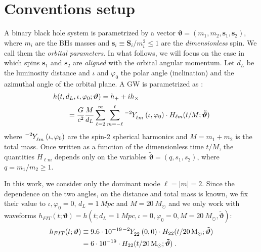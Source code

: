 \section{Conventions setup}
\label{sec:setup}
A binary black hole system is parametrized by a vector $ \boldsymbol{\vartheta} = (m_1,m_2, \mathbf{s}_1,\mathbf{s}_2) $, where $m_i$ are the 
BHs masses and $\mathbf{s}_i \equiv \mathbf{S}_i/m_i^2 \leq 1$ are the 
\textit{dimensionless} spin. We call them the \textit{orbital parameters}.
In what follows, we will focus on the case in which spins $\mathbf{s}_1$ and $\mathbf{s}_2$ are \textit{aligned} with the orbital angular momentum. 
Let $d_L$ be the luminosity distance and $\iota$ and $\varphi_0$ the polar angle (inclination) and the azimuthal angle of the orbital plane.
A GW is parametrized as \cite[eq. II.6]{ajith2011data}:
\begin{align} \label{eq:h_parametrization}
	&h(t, d_L,\iota,\varphi_0; \boldsymbol{\vartheta}) = h_+ + i h_\times \nonumber \\
		&\qquad= \frac{G}{c^2} \frac{M}{d_L}\sum_{\ell = 2}^{\infty} \sum_{m = -\ell}^{\ell} \tensor[^{-2}]{Y}{_{\ell m}}(\iota, \varphi_0) \cdot H_{\ell m}(t/M; \boldsymbol{\tilde{\vartheta}})
\end{align}
where $\tensor[^{-2}]{Y}{_{\ell m}}(\iota, \varphi_0)$ are the spin-2 spherical harmonics and $M = m_1+m_2$ is the total mass.
Once written as a function of the dimensionless time $t/M$, the quantities $H_{\ell m}$ depends only on the variables $\tilde{\boldsymbol{\vartheta}} = (q, s_1, s_2)$, where $q= m_1/m_2 \geq 1$.
\par
In this work, we consider only the dominant mode $\ell=|m|=2$.
Since the dependence on the two angles, on the distance and total mass is known, we fix their value to ${\iota, \varphi_0 = 0}$, ${d_L = \SI{1}{Mpc}}$ and $M = \SI{20}{M_\odot}$ and we only work with waveforms ${h_{FIT}(t; \boldsymbol{\vartheta}) = h(t; d_L = \SI{1}{Mpc}, \iota = 0, \varphi_0 = 0, M = \SI{20}{M_\odot}, \boldsymbol{\tilde{\vartheta}}) }$:
\begin{align}  
	h_{FIT}(t; \boldsymbol{\vartheta}) &\equiv 9.6 \cdot 10^{-19} \tensor[^{-2}]{Y}{_{2 2}}(0,0) \cdot H_{22}(t/\SI{20}{M_\odot}; \boldsymbol{\tilde{\vartheta}})  \nonumber \\
	&= 6 \cdot 10^{-19} \cdot H_{22}(t/\SI{20}{M_\odot}; \boldsymbol{\tilde{\vartheta}}) \label{eq:h_std} \; .
\end{align}
